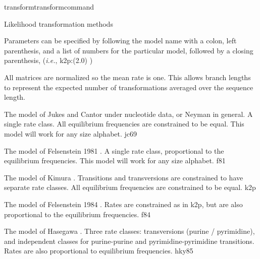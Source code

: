 \begin{command}{transform}{transformcommand}
\begin{arguments}
\begin{argumentgroup}{Likelihood transformation methods}
{                Parameters can be specified by following the model name with a
                colon, left parenthesis, and a list of numbers for the
                particular model, followed by a closing parenthesis, (\emph{i.e.},
                k2p:(2.0) )

                \begin{statement}
                    All matrices are normalized so the mean rate is one. This
                    allows branch lengths to represent the expected number of
                    transformations averaged over the sequence length.
                \end{statement}

                \begin{description}

                        {The model of Jukes and Cantor \cite{jukesandcantor1969}
                        under nucleotide data, or Neyman \cite{neyman1971} in general. A
                        single rate class. All equilibrium frequencies are
                        constrained to be equal. This model will work for any size
                        alphabet.}
                        {jc69}

                        {The model of Felsenstein 1981 \cite{felsenstein1981}. A
                        single rate class, proportional to the equilibrium
                        frequencies. This model will work for any size
                        alphabet.}
                        {f81}

                        {The model of Kimura \cite{kimura1980}. Transitions and
                        transversions are constrained to have separate rate
                        classes. All equilibrium frequencies are constrained to be
                        equal.}
                        {k2p}

                        {The model of Felsenstein 1984 \cite{felsenstein1980}. Rates
                        are constrained as in k2p, but are also proportional to
                        the equilibrium frequencies.}
                        {f84}

                        {The model of Hasegawa \cite{hasegawa1984}. Three rate classes:
                        transversions (purine / pyrimidine), and independent
                        classes for purine-purine and pyrimidine-pyrimidine
                        transitions. Rates are also proportional to equilibrium
                        frequencies.}
                        {hky85}


\end{description}}
\end{argumentgroup}
\end{arguments}
\end{command}
